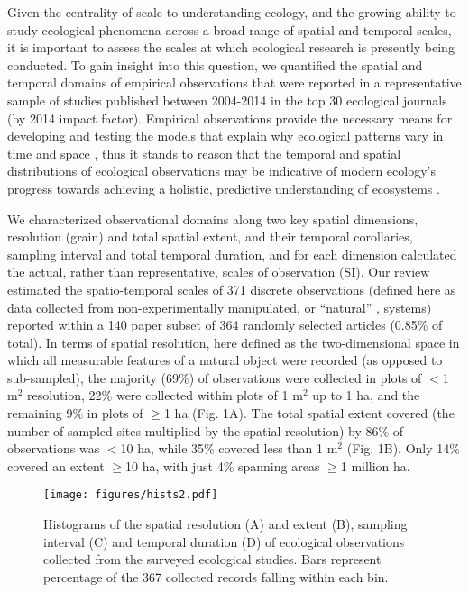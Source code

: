 \documentclass[12pt]{article}
\begin{document}
Given the centrality of scale to understanding ecology, and the growing ability to study ecological phenomena across a broad range of spatial and temporal scales, it is important to assess the scales at which ecological research is presently being conducted. To gain insight into this question, we quantified the spatial and temporal domains of empirical observations that were reported in a representative sample of studies published between 2004-2014 in the top 30 ecological journals (by 2014 impact factor). Empirical observations provide the necessary means for developing and testing the models that explain why ecological patterns vary in time and space \cite{levin_problem_1992, tilman_ecological_1989}, thus it stands to reason that the temporal and spatial distributions of ecological observations may be indicative of modern ecology's progress towards achieving a holistic, predictive understanding of ecosystems \cite{chave_problem_2013,levin_problem_1992}. 

We characterized observational domains along two key spatial dimensions, resolution (grain) and total spatial extent, and their temporal corollaries, sampling interval and total temporal duration, and for each dimension calculated the actual, rather than representative, scales of observation (SI). Our review estimated the spatio-temporal scales of 371 discrete observations (defined here as data collected from non-experimentally manipulated, or ``natural'' \cite{tilman_ecological_1989}, systems) reported within a 140 paper subset of 364 randomly selected articles (0.85\% of total). In terms of spatial resolution, here defined as the two-dimensional space in which all measurable features of a natural object were recorded (as opposed to sub-sampled), the majority (69\%) of observations were collected in plots of $<$1 m$^2$ resolution, 22\% were collected within plots of 1 m$^2$ up to 1 ha, and the remaining 9\% in plots of $\geq$1 ha (Fig. 1A). The total spatial extent covered (the number of sampled sites multiplied by the spatial resolution) by 86\% of observations was $<$10 ha, while 35\% covered less than 1 m$^2$ (Fig. 1B).  Only 14\% covered an extent $\geq$10 ha, with just 4\% spanning areas $\geq$1 million ha. 


\begin{figure}[!ht]
\texttt{[image: figures/hists2.pdf]}
\vspace{-0.15 cm}
\caption{Histograms of the spatial resolution (A) and extent (B), sampling interval (C) and temporal duration (D) of ecological observations collected from the surveyed ecological studies. Bars represent percentage of the 367 collected records falling within each bin.}
\label{afoto1}
\end{figure}
\end{document}
